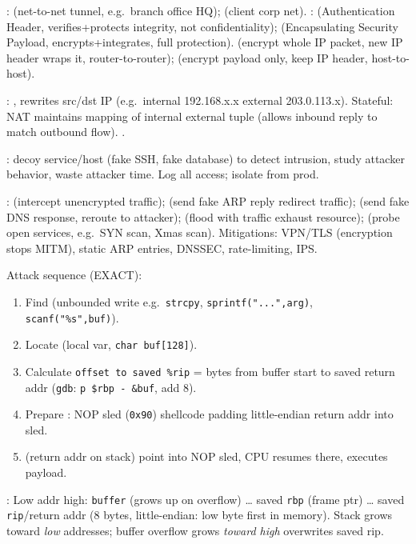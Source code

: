 :  (net-to-net tunnel, e.g.\ branch office \to HQ);  (client \to corp net). :  (Authentication Header, verifies+protects integrity, not confidentiality);  (Encapsulating Security Payload, encrypts+integrates, full protection).  (encrypt whole IP packet, new IP header wraps it, router-to-router);  (encrypt payload only, keep IP header, host-to-host).

: , rewrites src/dst IP (e.g.\ internal 192.168.x.x \to external 203.0.113.x). Stateful: NAT maintains mapping of internal \to external tuple (allows inbound reply to match outbound flow). .

: decoy service/host (fake SSH, fake database) to detect intrusion, study attacker behavior, waste attacker time. Log all access; isolate from prod.

:  (intercept unencrypted traffic);  (send fake ARP reply \to redirect traffic);  (send fake DNS response, reroute to attacker);  (flood with traffic \to exhaust resource);  (probe open services, e.g.\ SYN scan, Xmas scan). Mitigations: VPN/TLS (encryption stops MITM), static ARP entries, DNSSEC, rate-limiting, IPS.


 \fivept
Attack sequence (EXACT):
\begin{enumerate}
\setlength{\itemsep}{0pt}
\item Find  (unbounded write e.g.\ \texttt{strcpy}, \texttt{sprintf("...",arg)}, \texttt{scanf("\%s",buf)}).
\item Locate  (local var, \texttt{char buf[128]}).
\item Calculate \texttt{offset to saved \%rip} = bytes from buffer start to saved return addr (\texttt{gdb}: \texttt{p \$rbp - \&buf}, add 8).
\item Prepare : NOP sled (\texttt{0x90}) \to shellcode \to padding \to little-endian return addr into sled.
\item {} (return addr on stack) \to point into NOP sled, CPU resumes there, executes payload.
\end{enumerate}

: Low addr \to high: \texttt{buffer} (grows up on overflow) \ldots{} saved \texttt{rbp} (frame ptr) \ldots{} saved \texttt{rip}/return addr (8 bytes, little-endian: low byte first in memory). Stack grows toward \textit{low} addresses; buffer overflow grows \textit{toward high} \to overwrites saved rip.

